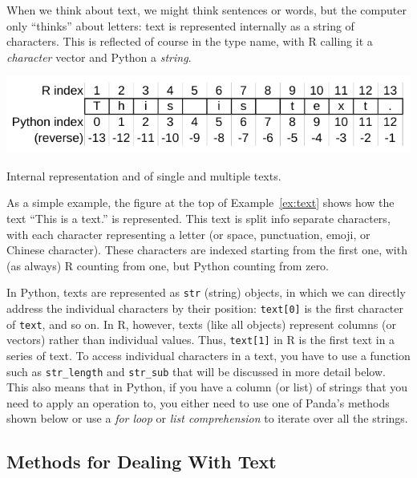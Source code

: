 When we think about text, we might think sentences or words, but the computer only ``thinks'' about letters:
text is represented internally as a string of characters.
This is reflected of course in the type name, with R calling it a \emph{character} vector and Python a \emph{string}.

\begin{ccsexample}
  \begin{center} \includegraphics[width=.6\textwidth]{chapter09/text.pdf}\end{center}


  \caption{Internal representation and of single and multiple texts.}\label{ex:text}
\end{ccsexample}

As a simple example, the figure at the top of Example~\ref{ex:text} shows how the text ``This is a text.'' is represented.
This text is split info separate characters, with each character representing a letter (or space,  punctuation, emoji, or Chinese character).
These characters are indexed starting from the first one, with (as always) R counting from one, but Python counting from zero.

In Python, texts are represented as \texttt{str} (string) objects, in which we can directly address the individual characters by their position: \texttt{\small{text[0]}} is the first character of \texttt{\small{text}}, and so on.
In R, however, texts (like all objects) represent columns (or vectors) rather than individual values.
Thus, \texttt{\small{text[1]}} in R is the first text in a series of text.
To access individual characters in a text, you have to use a function such as \texttt{str\_length} and \texttt{str\_sub} that will be discussed in more detail below.
This also means that in Python, if you have a column (or list) of strings that you need to apply an operation to,
you either need to use one of Panda's methods shown below or use a \emph{for loop} or \emph{list comprehension} to iterate over all the strings.

\subsection{Methods for Dealing With Text}

